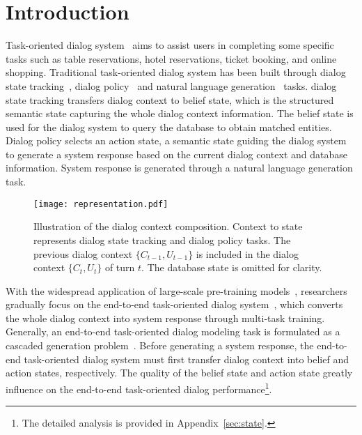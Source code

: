 \section{Introduction}
\label{sec:first}
Task-oriented dialog system~\cite{DBLP:journals/corr/abs-2003-07490} aims to assist users in completing  some specific tasks such as table reservations, hotel reservations,  ticket booking, and online shopping.
Traditional  task-oriented dialog system has been built through  dialog state tracking~\cite{lee-etal-2019-sumbt,wu-etal-2019-transferable}, dialog policy~\cite{DBLP:journals/corr/SchulmanWDRK17,takanobu-etal-2019-guided} and natural language generation~\cite{wen-etal-2015-semantically} tasks.
dialog state tracking  transfers dialog context to belief state, which is the structured semantic state capturing  the whole dialog context information. The belief state is used for the dialog system to query the database to  obtain  matched entities.
Dialog policy    selects an action state,  a semantic state guiding the dialog system to generate a system response based on the current dialog context and database information. System response is generated through a  natural language generation task.  
\begin{figure}[!t]
  \centering
  \texttt{[image: representation.pdf]}
  \caption{Illustration of the dialog context composition. Context to state represents dialog state tracking and dialog policy tasks. The previous dialog context $\{C_{t-1},U_{t-1}\}$ is included in the dialog context $\{C_{t},U_t\}$ of turn $t$. The database state is omitted for clarity.}%
  \label{fig:representation}
\end{figure}

With the widespread application of large-scale pre-training models~\cite{devlin-etal-2019-bert,radford2019language,2020t5}, researchers gradually focus on the end-to-end task-oriented dialog system~\cite{lin-etal-2020-mintl,DBLP:conf/nips/Hosseini-AslMWY20,DBLP:conf/aaai/YangLQ21}, which  converts the whole dialog context into system response through multi-task training.
Generally, an end-to-end task-oriented dialog modeling task is formulated as a cascaded generation problem~\cite{DBLP:journals/corr/abs-2109-14739}. 
Before generating a system response, the end-to-end task-oriented dialog system must first  transfer dialog  context into belief and action states, respectively.  The quality of the belief state and action state greatly influence on the end-to-end task-oriented dialog performance\footnote{The detailed  analysis is provided in Appendix~\ref{sec:state}.}.

